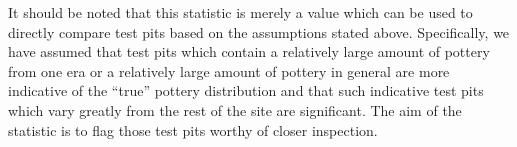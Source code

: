 \documentclass[conference]{IEEEtran}
\begin{document}
It should be noted that this statistic is merely a value which can be used to
directly compare test pits based on the assumptions stated above. Specifically,
we have assumed that test pits which contain a relatively large amount of
pottery from one era or a relatively large amount of pottery in general are more
indicative of the ``true'' pottery distribution and that such indicative test
pits which vary greatly from the rest of the site are significant. The aim of
the statistic is to flag those test pits worthy of closer inspection.
\end{document}
